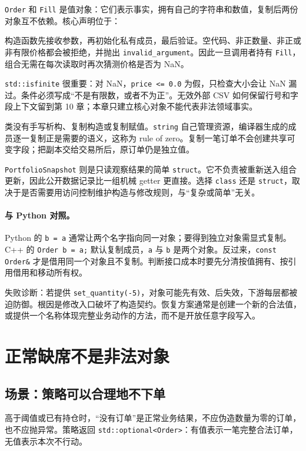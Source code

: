 \texttt{Order} 和 \texttt{Fill} 是值对象：它们表示事实，拥有自己的字符串和数值，复制后两份对象互不依赖。核心声明位于：



构造函数先接收参数，再初始化私有成员，最后验证。空代码、非正数量、非正或非有限价格都会被拒绝，并抛出 \texttt{invalid\_\allowbreak argument}。因此一旦调用者持有 \texttt{Fill}，组合无需在每次读取时再次猜测价格是否为 NaN。

\texttt{std::isfinite} 很重要：对 NaN，\texttt{price <= 0.0} 为假，只检查大小会让 NaN 漏过。条件必须写成“不是有限数，或者不为正”。无效外部 CSV 如何保留行号和字段上下文留到第 10 章；本章只建立核心对象不能代表非法领域事实。

类没有手写析构、复制构造或复制赋值。\texttt{string} 自己管理资源，编译器生成的成员逐一复制正是需要的语义，这称为 rule of zero。复制一笔订单不会创建共享可变字段；把副本交给交易所后，原订单仍是独立值。

\texttt{PortfolioSnapshot} 则是只读观察结果的简单 \texttt{struct}。它不负责被重新送入组合更新，因此公开数据记录比一组机械 getter 更直接。选择 \texttt{class} 还是 \texttt{struct}，取决于是否需要用访问控制维护构造与修改规则，与“复杂或简单”无关。

\paragraph{与 Python 对照。}
Python 的 \texttt{b = a} 通常让两个名字指向同一对象；要得到独立对象需显式复制。C++ 的 \texttt{Order b = a;} 默认复制成员，\texttt{a} 与 \texttt{b} 是两个对象。反过来，\texttt{const Order\&} 才是借用同一个对象且不复制。判断接口成本时要先分清按值拥有、按引用借用和移动所有权。

失败诊断：若提供 \texttt{set\_quantity(-5)}，对象可能先有效、后失效，下游每层都被迫防御。根因是修改入口破坏了构造契约。恢复方案通常是创建一个新的合法值，或提供一个名称体现完整业务动作的方法，而不是开放任意字段写入。

\section{正常缺席不是非法对象}

\subsection{场景：策略可以合理地不下单}

高于阈值或已有持仓时，“没有订单”是正常业务结果，不应伪造数量为零的订单，也不应抛异常。策略返回 \texttt{std::optional<Order>}：有值表示一笔完整合法订单，无值表示本次不行动。

